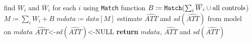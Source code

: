 \documentclass{report}
\newcommand{\code}[1]{\texttt{#1}}
\begin{document}
\nopagecolor
\begin{algorithm}
\begin{algorithmic}[H]
\State find $W_i$ and $\overline{W}_i$ for each $i$ using \code{Match} function
\State $B\coloneqq \textrm{\code{Match}}(\sum_i \overline{W}_i \cup \textrm{all controls}$)%
\State $M\coloneqq \sum_i W_i + B$
\State $mdata\coloneqq data[M]$
\State estimate $\widehat{ATT}$ and $sd(\widehat{ATT})$ from model on $mdata$
\Else
\State $\widehat{ATT}$<-$sd(\widehat{ATT})$<-NULL
\EndIf
\State \textbf{return} $mdata$, $\widehat{ATT}$ and $sd(\widehat{ATT})$  %
\EndProcedure
\end{algorithmic}
\end{algorithm}
\end{document}

